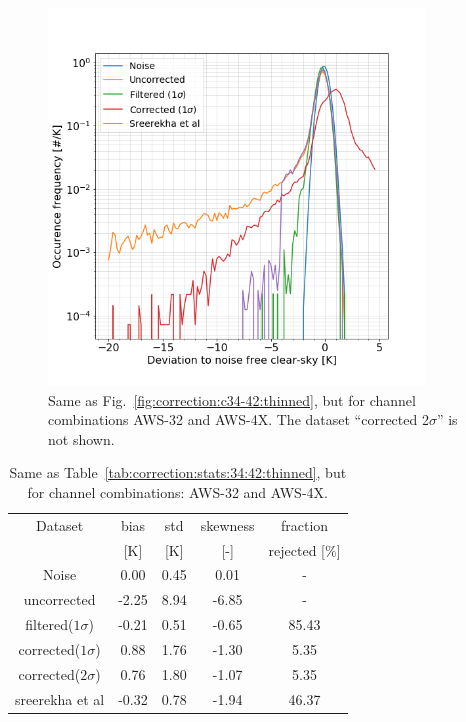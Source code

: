 \documentclass[12pt]{article}
\begin{document}
\begin{figure}[!p]
	\centering
	\includegraphics[height=100mm]{PDF_corrected_AWS-32_AWS-4X_thinned}
	\caption{Same as Fig.~\ref{fig:correction:c34-42:thinned}, but for channel combinations AWS-32 and AWS-4X. The dataset ``corrected 2$\sigma$'' is not shown.  }
	\label{fig:correction:c32-4X:thinned}
\end{figure}

\begin{table}[!p]
	\centering
	\begin{tabular}[b]{c|c|c|c|c}
		Dataset  		  &   bias &   std & skewness & fraction \\
						&   [K]  &   [K] & [-] 		& rejected [\%]\\
		\hline
Noise             		&  0.00 &  0.45 &               0.01 &                - \\
uncorrected       		&  -2.25 &  8.94 &              -6.85 &                - \\
filtered($1\sigma$)  	&  -0.21 &  0.51 &              -0.65 &               85.43 \\
corrected($1\sigma$) 	&   0.88 &  1.76 &              -1.30 &                5.35 \\
corrected($2\sigma$) 	&   0.76 &  1.80 &              -1.07 &                5.35 \\
sreerekha et al   		&  -0.32 &  0.78 &              -1.94 &               46.37 \\
		\hline
	\end{tabular}
	\caption{Same as Table~\ref{tab:correction:stats:34:42:thinned}, but for
      channel combinations: AWS-32 and AWS-4X. }
	\label{tab:correction:stats:32:4X}
\end{table}
\end{document}
